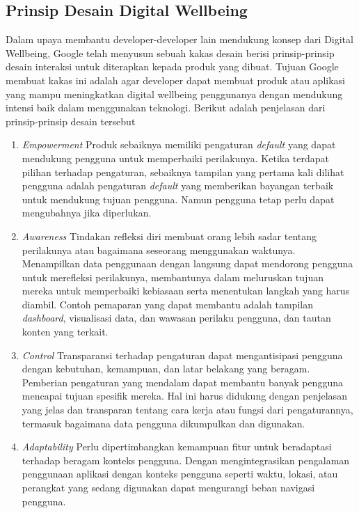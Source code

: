 \subsection{Prinsip Desain Digital Wellbeing}
\label{subsec:prinsip_desain_dw}

Dalam upaya membantu developer-developer lain mendukung konsep dari Digital Wellbeing, Google \textcite{google2021dwframework} telah menyusun sebuah kakas desain berisi prinsip-prinsip desain interaksi untuk diterapkan kepada produk yang dibuat. Tujuan Google membuat kakas ini adalah agar developer dapat membuat produk atau aplikasi yang mampu meningkatkan digital wellbeing penggunanya dengan mendukung intensi baik dalam menggunakan teknologi. Berikut adalah penjelasan dari prinsip-prinsip desain tersebut

\begin{enumerate}
  \item \textit{Empowerment}
  \subitem Produk sebaiknya memiliki pengaturan \textit{default} yang dapat mendukung pengguna untuk memperbaiki perilakunya. Ketika terdapat pilihan terhadap pengaturan, sebaiknya tampilan yang pertama kali dilihat pengguna adalah pengaturan \textit{default} yang memberikan bayangan terbaik untuk mendukung tujuan pengguna. Namun pengguna tetap perlu dapat mengubahnya jika diperlukan.

  \item \textit{Awareness}
  \subitem Tindakan refleksi diri membuat orang lebih sadar tentang perilakunya atau bagaimana seseorang menggunakan waktunya. Menampilkan data penggunaan dengan langsung dapat mendorong pengguna untuk merefleksi perilakunya, membantunya dalam meluruskan tujuan mereka untuk memperbaiki kebiasaan serta menentukan langkah yang harus diambil. Contoh pemaparan yang dapat membantu adalah tampilan \textit{dashboard}, visualisasi data, dan wawasan perilaku pengguna, dan tautan konten yang terkait.

  \item \textit{Control}
  \subitem Transparansi terhadap pengaturan dapat mengantisipasi pengguna dengan kebutuhan, kemampuan, dan latar belakang yang beragam. Pemberian pengaturan yang mendalam dapat membantu banyak pengguna mencapai tujuan spesifik mereka. Hal ini harus didukung dengan penjelasan yang jelas dan transparan tentang cara kerja atau fungsi dari pengaturannya, termasuk bagaimana data pengguna dikumpulkan dan digunakan.

  \item \textit{Adaptability}
  \subitem Perlu dipertimbangkan kemampuan fitur untuk beradaptasi terhadap beragam konteks pengguna. Dengan mengintegrasikan pengalaman penggunaan aplikasi dengan konteks pengguna seperti waktu, lokasi, atau perangkat yang sedang digunakan dapat mengurangi beban navigasi pengguna.

\end{enumerate}


